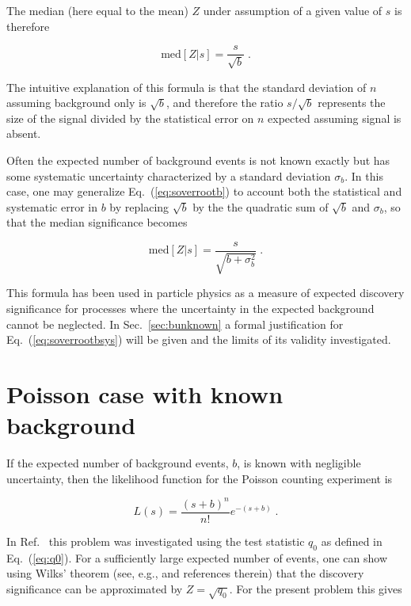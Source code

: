 \documentclass[11pt]{article}
\begin{document}
\noindent The median (here equal to the mean) $Z$ under assumption of
a given value of $s$ is therefore

\begin{equation}
\label{eq:soverrootb}
\mbox{med}[Z | s] = \frac{s}{\sqrt{b}} \;.
\end{equation}

\noindent The intuitive explanation of this formula is that the
standard deviation of $n$ assuming background only is $\sqrt{b}$, and
therefore the ratio $s/\sqrt{b}$ represents the size of the signal
divided by the statistical error on $n$ expected assuming signal is
absent. 

Often the expected number of background events is not known exactly
but has some systematic uncertainty characterized by a standard
deviation $\sigma_b$.  In this case, one may generalize
Eq.~(\ref{eq:soverrootb}) to account both the statistical and
systematic error in $b$ by replacing $\sqrt{b}$ by the the quadratic
sum of $\sqrt{b}$ and $\sigma_b$, so that the median significance
becomes

\begin{equation}
\label{eq:soverrootbsys}
\mbox{med}[Z | s] = \frac{s}{\sqrt{b + \sigma_b^2}} \;.
\end{equation}

\noindent This formula has been used in particle physics as a measure
of expected discovery significance for processes where the uncertainty
in the expected background cannot be neglected.  In
Sec.~\ref{sec:bunknown} a formal justification for
Eq.~(\ref{eq:soverrootbsys}) will be given and the limits of its
validity investigated.

\section{Poisson case with  known background}
\label{sec:bknown}

If the expected number of background events, $b$, is known with
negligible uncertainty, then the likelihood function for
the Poisson counting experiment is

\begin{equation}
\label{eq:poissonL}
L(s) = \frac{(s+b)^n}{n!} e^{-(s+b)} \;.
\end{equation}

\noindent In Ref.~\cite{asimov} this problem was investigated using
the test statistic $q_0$ as defined in Eq.~(\ref{eq:q0}).  For a
sufficiently large expected number of events, one can show using
Wilks' theorem (see, e.g., \cite{asimov} and references therein) that
the discovery significance can be approximated by $Z = \sqrt{ q_0}$.
For the present problem this gives
\end{document}
